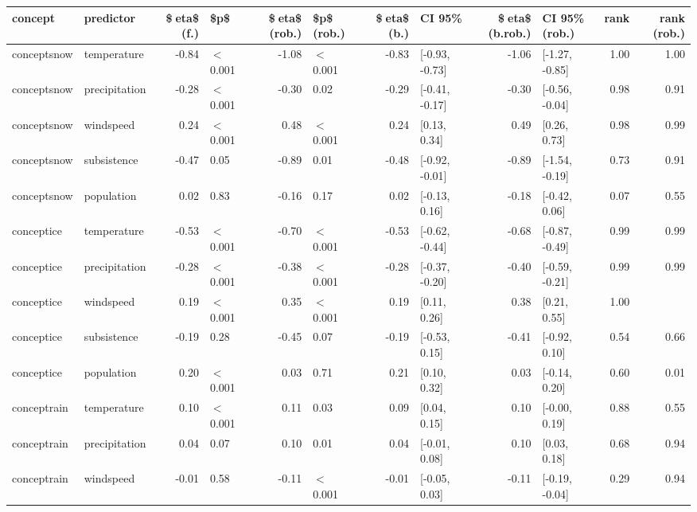 \begin{table}[ht]
\centering
\begin{tabular}{llrlrlrlrlrr}
  \hline
concept & predictor & \$eta\$ (f.) & \$p\$ & \$eta\$ (rob.) & \$p\$ (rob.) & \$eta\$ (b.) & CI 95\% & \$eta\$ (b.rob.) & CI 95\% (rob.) & rank & rank (rob.) \\ 
  \hline
conceptsnow & temperature & -0.84 & $<$ 0.001 & -1.08 & $<$ 0.001 & -0.83 & [-0.93, -0.73] & -1.06 & [-1.27, -0.85] & 1.00 & 1.00 \\ 
  conceptsnow & precipitation & -0.28 & $<$ 0.001 & -0.30 & 0.02 & -0.29 & [-0.41, -0.17] & -0.30 & [-0.56, -0.04] & 0.98 & 0.91 \\ 
  conceptsnow & windspeed & 0.24 & $<$ 0.001 & 0.48 & $<$ 0.001 & 0.24 & [0.13, 0.34] & 0.49 & [0.26, 0.73] & 0.98 & 0.99 \\ 
  conceptsnow & subsistence & -0.47 & 0.05 & -0.89 & 0.01 & -0.48 & [-0.92, -0.01] & -0.89 & [-1.54, -0.19] & 0.73 & 0.91 \\ 
  conceptsnow & population & 0.02 & 0.83 & -0.16 & 0.17 & 0.02 & [-0.13, 0.16] & -0.18 & [-0.42, 0.06] & 0.07 & 0.55 \\ 
  conceptice & temperature & -0.53 & $<$ 0.001 & -0.70 & $<$ 0.001 & -0.53 & [-0.62, -0.44] & -0.68 & [-0.87, -0.49] & 0.99 & 0.99 \\ 
  conceptice & precipitation & -0.28 & $<$ 0.001 & -0.38 & $<$ 0.001 & -0.28 & [-0.37, -0.20] & -0.40 & [-0.59, -0.21] & 0.99 & 0.99 \\ 
  conceptice & windspeed & 0.19 & $<$ 0.001 & 0.35 & $<$ 0.001 & 0.19 & [0.11, 0.26] & 0.38 & [0.21, 0.55] & 1.00 &  \\ 
  conceptice & subsistence & -0.19 & 0.28 & -0.45 & 0.07 & -0.19 & [-0.53, 0.15] & -0.41 & [-0.92, 0.10] & 0.54 & 0.66 \\ 
  conceptice & population & 0.20 & $<$ 0.001 & 0.03 & 0.71 & 0.21 & [0.10, 0.32] & 0.03 & [-0.14, 0.20] & 0.60 & 0.01 \\ 
  conceptrain & temperature & 0.10 & $<$ 0.001 & 0.11 & 0.03 & 0.09 & [0.04, 0.15] & 0.10 & [-0.00, 0.19] & 0.88 & 0.55 \\ 
  conceptrain & precipitation & 0.04 & 0.07 & 0.10 & 0.01 & 0.04 & [-0.01, 0.08] & 0.10 & [0.03, 0.18] & 0.68 & 0.94 \\ 
  conceptrain & windspeed & -0.01 & 0.58 & -0.11 & $<$ 0.001 & -0.01 & [-0.05, 0.03] & -0.11 & [-0.19, -0.04] & 0.29 & 0.94 \\ 

\end{tabular}
\end{table}
